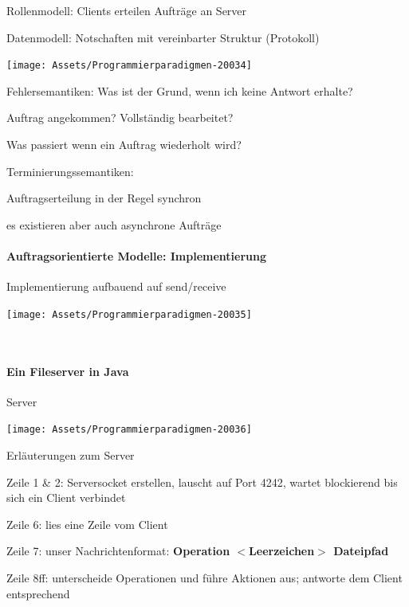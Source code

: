 \documentclass[10pt]{article}
\begin{document}
  \begin{itemize*}
    \item Rollenmodell: Clients erteilen Aufträge an Server
    \item Datenmodell: Notschaften mit vereinbarter Struktur (Protokoll)
  \end{itemize*}
  \begin{center}
    \centering
    \texttt{[image: Assets/Programmierparadigmen-20034]}
  \end{center}
  \begin{itemize*}
    \item Fehlersemantiken: Was ist der Grund, wenn ich keine Antwort erhalte?
    \begin{itemize*}
      \item Auftrag angekommen? Vollständig bearbeitet?
      \item Was passiert wenn ein Auftrag wiederholt wird?
    \end{itemize*}
    \item Terminierungssemantiken:
    \begin{itemize*}
      \item Auftragserteilung in der Regel synchron
      \item es existieren aber auch asynchrone Aufträge
    \end{itemize*}
  \end{itemize*}
  
  \paragraph{Auftragsorientierte Modelle: Implementierung}
  
  \begin{itemize*}
    \item Implementierung aufbauend auf send/receive
  \end{itemize*}
  \begin{center}
    \centering
    \texttt{[image: Assets/Programmierparadigmen-20035]}
  \end{center} \ \linebreak
  
  \paragraph{Ein Fileserver in Java}
  
  Server
  \begin{center}
    \centering
    \texttt{[image: Assets/Programmierparadigmen-20036]}
  \end{center}
  Erläuterungen zum Server
  \begin{itemize*}
    \item Zeile 1 \& 2: Serversocket erstellen, lauscht auf Port 4242, wartet blockierend bis sich ein Client verbindet
    \item Zeile 6: lies eine Zeile vom Client
    \item Zeile 7: unser Nachrichtenformat: \textbf{Operation $<$Leerzeichen$>$ Dateipfad}
    \item Zeile 8ff: unterscheide Operationen und führe Aktionen aus; antworte dem Client entsprechend
  \end{itemize*}
  
\end{document}
